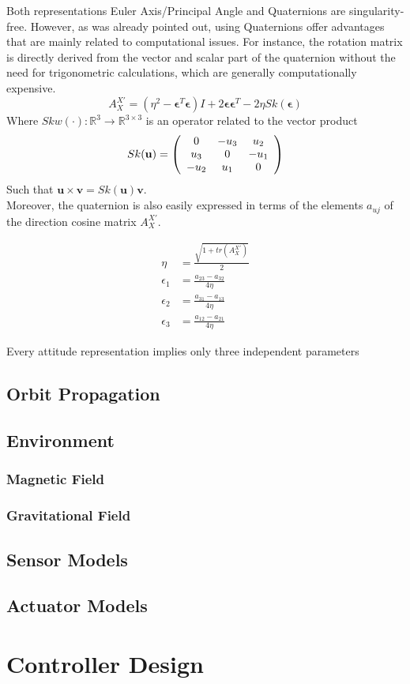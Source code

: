 Both representations Euler Axis/Principal Angle and Quaternions are singularity-free. However, as was already pointed out, using Quaternions offer advantages that are mainly related to computational issues. For instance, the rotation matrix is directly derived from the vector and scalar part of the quaternion without the need for trigonometric calculations, which are generally computationally expensive.
\begin{equation}
A_X^{X'} = (\eta^2 - \pmb{\epsilon}^T \pmb{\epsilon}) I +
2\pmb{\epsilon}\pmb{\epsilon}^T - 2\eta Sk(\pmb{\epsilon})
\end{equation}
Where $Skw(\cdot): \mathbb{R}^3 \longrightarrow \mathbb{R}^{3\times 3}$ is an operator related to the vector product 
\begin{equation}
Sk(\mathbf{u}) = 
\left(\begin{array}{c c c}
0 & -u_3 & u_2 \\
u_3 & 0 & -u_1 \\
-u_2 & u_1 & 0
\end{array} \right)
\end{equation}
Such that $\mathbf{u}\times\mathbf{v} = Sk(\mathbf{u})\mathbf{v}$.\\

Moreover, the quaternion is also easily expressed in terms of the elements $a_{uj}$ of the direction cosine matrix $A_X^{X'}$.
	
\begin{equation}
\begin{aligned}
\eta & = \frac{\sqrt{1+tr\left(A_X^{X'}\right)}}{2}\\
	\epsilon_1 & = \frac{a_{23} - a_{32}}{4\eta}\\
	\epsilon_2 & = \frac{a_{31} - a_{13}}{4\eta}\\
	\epsilon_3 & = \frac{a_{12} - a_{21}}{4\eta}
	\end{aligned}
\end{equation}


Every attitude representation implies only three independent parameters

\subsection{Orbit Propagation}

\subsection{Environment}

\subsubsection{Magnetic Field}
\subsubsection{Gravitational Field}

\subsection{Sensor Models}

\subsection{Actuator Models}

\section{Controller Design}
